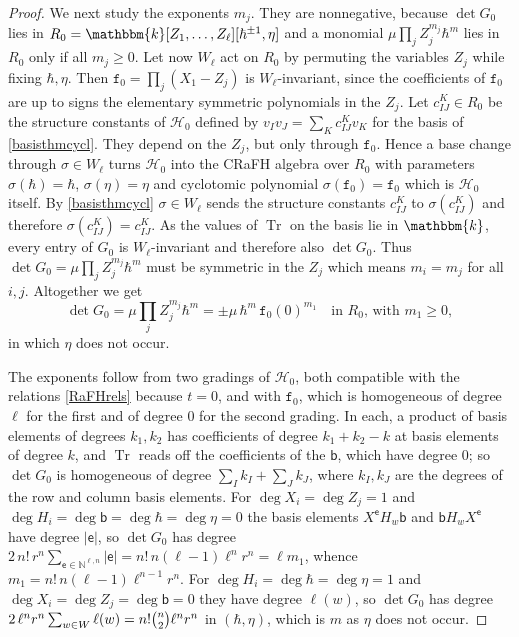 \documentclass[a4paper,11pt]{amsart}
\newcommand{\Tr}{\op{Tr}}
\numberwithin{equation}{subsection}
\theoremstyle{definition}
\theoremstyle{theorem}
\theoremstyle{remark}
\newcommand\Sym{W}
\newcommand\bb{\mathsf{b}}
\newcommand\be{\mathsf{e}}
\newcommand\op{\operatorname}
\newcommand\N{\mathbb{N}}
\newcommand\kk{\mathbbm{k}}
\begin{document}
\begin{proof}
We next study the exponents $m_j$. They are nonnegative, because $\det G_0$ lies in $R_0=\kk[Z_1,\dots,Z_\ell][\hbar^{\pm1},\eta]$ and a monomial $\mu\prod_jZ_j^{m_j}\hbar^{m}$ lies in $R_0$ only if all $m_j\geq0$. Let now  $\Sym_\ell$ act on $R_0$ by permuting the variables $Z_j$ while fixing $\hbar,\eta$. Then $\mathtt f_0=\prod_j(X_1-Z_j)$ is $\Sym_\ell$-invariant, since the coefficients of $\mathtt f_0$ are up to signs the elementary symmetric polynomials in the $Z_j$. Let $c^{K}_{IJ}\in R_0$ be the structure constants of $\mathcal H_0$  defined by $v_Iv_J=\sum_Kc^{K}_{IJ}v_K$ for the basis of \autoref{basisthmcycl}. They depend on the $Z_j$, but only through $\mathtt f_0$. Hence a base change through $\sigma\in\Sym_\ell$
 turns $\mathcal H_0$ into the CRaFH algebra over $R_0$ with parameters $\sigma(\hbar)=\hbar$, $\sigma(\eta)=\eta$ and cyclotomic polynomial $\sigma(\mathtt f_0)=\mathtt f_0$ which is  $\mathcal H_0$ itself.  By  \autoref{basisthmcycl} $\sigma\in\Sym_\ell$ sends the structure constants $c^{K}_{IJ}$ to  $\sigma(c^{K}_{IJ})$ and therefore  $\sigma(c^{K}_{IJ})=c^{K}_{IJ}$.  As the values of $\Tr$ on the basis lie in $\kk$, every entry of $G_0$ is $\Sym_\ell$-invariant and therefore also  $\det G_0$. Thus $\det G_0=\mu\prod_jZ_j^{m_j}\hbar^{m}$ must be symmetric in the $Z_j$ which means $m_i=m_j$ for all $i,j$.  Altogether we get
\[
\det G_0=\mu\prod_jZ_j^{m_j}\hbar^{m}=\pm\mu\,\hbar^{m}\,\mathtt f_0(0)^{m_1}\quad\text{in }R_0\text{, with }m_1\geq0,
\]
in which $\eta$ does not occur.

The exponents follow from two gradings of $\mathcal H_0$, both compatible with the relations \autoref{RaFHrels} because $t=0$, and with $\mathtt f_0$, which is homogeneous of degree $\ell$ for the first and of degree $0$ for the second grading. In each, a product of basis elements of degrees $k_1,k_2$ has coefficients of degree $k_1+k_2-k$ at basis elements of degree $k$, and $\Tr$ reads off the coefficients of the $\bb$, which have degree $0$; so $\det G_0$ is homogeneous of degree $\sum_Ik_I+\sum_Jk_J$, where $k_I,k_J$ are the degrees of the row and column basis elements. For $\deg X_i=\deg Z_j=1$ and $\deg H_i=\deg\bb=\deg\hbar=\deg\eta=0$ the basis elements $X^{\be}H_w\bb$ and $\bb H_wX^{\be}$ have degree $|\be|$, so $\det G_0$ has degree $2\,n!\,r^{n}\sum_{\be\in\N^{\ell,n}}|\be|=n!\,n(\ell-1)\ell^{n}r^{n}=\ell m_1$, whence $m_1=n!\,n(\ell-1)\ell^{n-1}r^{n}$. For $\deg H_i=\deg\hbar=\deg\eta=1$ and $\deg X_i=\deg Z_j=\deg\bb=0$ they have degree $\ell(w)$, so $\det G_0$ has degree $2\,\ell^{n}r^{n}\sum_{w\in\Sym}\ell(w)=n!\tbinom n2\ell^{n}r^{n}$ in $(\hbar,\eta)$, which is $m$ as $\eta$ does not occur.


\end{proof}
\end{document}
